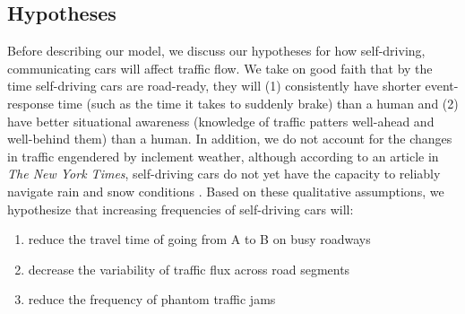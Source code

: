 \subsection{Hypotheses}
Before describing our model, we discuss our hypotheses for how self-driving, communicating cars will affect traffic flow.  We take on good faith that by the time self-driving cars are road-ready, they will (1) consistently have shorter event-response time (such as the time it takes to suddenly brake) than a human and (2) have better situational awareness (knowledge of traffic patters well-ahead and well-behind them) than a human.  In addition, we do not account for the changes in traffic engendered by inclement weather, although according to an article in \textit{The New York Times}, self-driving cars do not yet have the capacity to reliably navigate rain and snow conditions \cite{Boudette20165Headaches}.   Based on these qualitative assumptions, we hypothesize that increasing frequencies of self-driving cars will:

\begin{enumerate}
\item reduce the travel time of going from A to B on busy roadways
\item decrease the variability of traffic flux across road segments 
\item reduce the frequency of phantom traffic jams 
\end{enumerate}